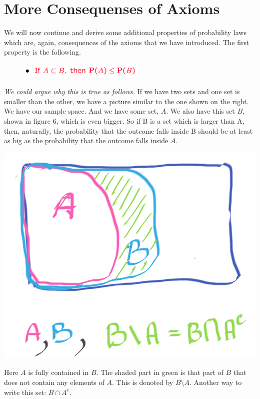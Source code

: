 \documentclass{tufte-handout}
\begin{document}
\pagebreak
\section{More Consequenses of Axioms}\label{sec:axiom-consequences}

 We will now continue and derive some additional properties of probability laws which are, again,
consequences of the axioms that we have introduced. The first property is the following.

\begin{figure}[h]
  \includegraphics[width=6cm]{Conseq1}
\end{figure}



\textit{We could argue why this is true as follows.} If we have two
sets and one set is smaller than the other, we have a picture similar to the one shown on the right. We have our sample
space. And we have some set, $A$.
We also have this set $B$, shown in figure 6, which is even bigger. So if B is a
set which is larger than A, then, naturally, the probability that the outcome falls inside B should be at
least as big as the probability that the outcome falls inside $A$.

\begin{marginfigure}
  \includegraphics{AinB}
  \caption{Here $A$ is fully contained in $B$. The shaded part in green is that part of $B$ that does not contain any elements of $A$. This is denoted by $B \setminus A$. Another way to write this set: $B \cap A^c$.}
\end{marginfigure}
\end{document}
